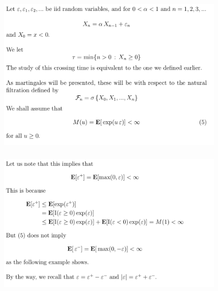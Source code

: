 \documentclass[c, dvipsnames, 8pt]{beamer}
\begin{document}
\begin{frame}[shrink=5]
	
	
	
	\frametitle{\insertsection} 
	\begin{figure}
		\centering
		\includegraphics[width=1\linewidth]{screenshot042}
		\label{fig:screenshot001}
	\end{figure}
	
	
	
	
	
\end{frame}





\begin{frame}[shrink=5]
	
	
	
	\frametitle{\insertsection} 
	\begin{figure}
		\centering
		\includegraphics[width=1\linewidth]{screenshot043}
		\label{fig:screenshot001}
	\end{figure}
	
	
	
	
	
\end{frame}
\end{document}
